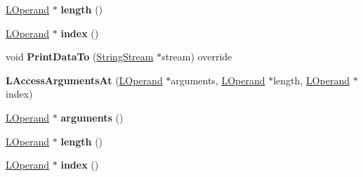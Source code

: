 \begin{DoxyCompactItemize}
\item 
\hyperlink{classv8_1_1internal_1_1_l_operand}{L\+Operand} $\ast$ {\bfseries length} ()\hypertarget{classv8_1_1internal_1_1_l_access_arguments_at_aca767dd582bd23265453d015e4cb3174}{}\label{classv8_1_1internal_1_1_l_access_arguments_at_aca767dd582bd23265453d015e4cb3174}

\item 
\hyperlink{classv8_1_1internal_1_1_l_operand}{L\+Operand} $\ast$ {\bfseries index} ()\hypertarget{classv8_1_1internal_1_1_l_access_arguments_at_a6d772ab178a18a50a3fa64dee0cab4c7}{}\label{classv8_1_1internal_1_1_l_access_arguments_at_a6d772ab178a18a50a3fa64dee0cab4c7}

\item 
void {\bfseries Print\+Data\+To} (\hyperlink{classv8_1_1internal_1_1_string_stream}{String\+Stream} $\ast$stream) override\hypertarget{classv8_1_1internal_1_1_l_access_arguments_at_a3027cb02e655a31d8f9264d10b49c7be}{}\label{classv8_1_1internal_1_1_l_access_arguments_at_a3027cb02e655a31d8f9264d10b49c7be}

\item 
{\bfseries L\+Access\+Arguments\+At} (\hyperlink{classv8_1_1internal_1_1_l_operand}{L\+Operand} $\ast$arguments, \hyperlink{classv8_1_1internal_1_1_l_operand}{L\+Operand} $\ast$length, \hyperlink{classv8_1_1internal_1_1_l_operand}{L\+Operand} $\ast$index)\hypertarget{classv8_1_1internal_1_1_l_access_arguments_at_a8b3a736e564c8f5337bf40bebffae277}{}\label{classv8_1_1internal_1_1_l_access_arguments_at_a8b3a736e564c8f5337bf40bebffae277}

\item 
\hyperlink{classv8_1_1internal_1_1_l_operand}{L\+Operand} $\ast$ {\bfseries arguments} ()\hypertarget{classv8_1_1internal_1_1_l_access_arguments_at_a54eb42639fc35df69b3a3f57d7042ffd}{}\label{classv8_1_1internal_1_1_l_access_arguments_at_a54eb42639fc35df69b3a3f57d7042ffd}

\item 
\hyperlink{classv8_1_1internal_1_1_l_operand}{L\+Operand} $\ast$ {\bfseries length} ()\hypertarget{classv8_1_1internal_1_1_l_access_arguments_at_aca767dd582bd23265453d015e4cb3174}{}\label{classv8_1_1internal_1_1_l_access_arguments_at_aca767dd582bd23265453d015e4cb3174}

\item 
\hyperlink{classv8_1_1internal_1_1_l_operand}{L\+Operand} $\ast$ {\bfseries index} ()\hypertarget{classv8_1_1internal_1_1_l_access_arguments_at_a6d772ab178a18a50a3fa64dee0cab4c7}{}\label{classv8_1_1internal_1_1_l_access_arguments_at_a6d772ab178a18a50a3fa64dee0cab4c7}


\end{DoxyCompactItemize}
